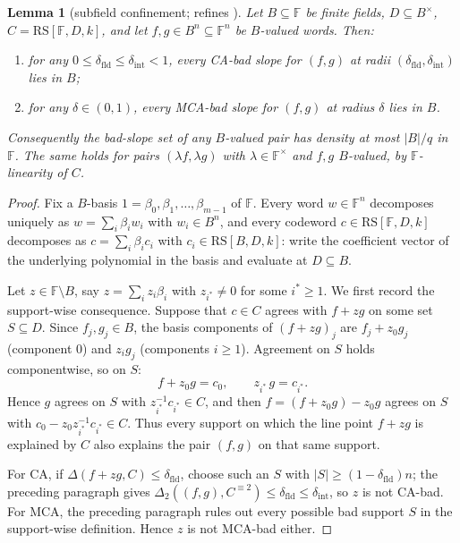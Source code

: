 \documentclass[11pt]{article}
\newtheorem{lemma}[lemma]{Lemma}
\theoremstyle{definition}
\theoremstyle{remark}
\newcommand{\F}{\mathbb{F}}
\newcommand{\B}{B}
\newcommand{\RS}{\mathrm{RS}}
\newcommand{\dist}{\Delta}
\begin{document}
\begin{lemma}[subfield confinement; refines {\cite{Cho26b}}]\label{lem:confine}
Let $\B\subseteq\F$ be finite fields, $D\subseteq\B^\times$, $C=\RS[\F,D,k]$, and let $f,g\in\B^n\subseteq\F^n$ be $\B$-valued words. Then:
\begin{enumerate}[label=\textup{(\alph*)}]
\item for any $0\le\delta_{\mathrm{fld}}\le\delta_{\mathrm{int}}<1$, every CA-bad slope for $(f,g)$ at radii $(\delta_{\mathrm{fld}},\delta_{\mathrm{int}})$ lies in $\B$;
\item for any $\delta\in(0,1)$, every MCA-bad slope for $(f,g)$ at radius $\delta$ lies in $\B$.
\end{enumerate}
Consequently the bad-slope set of any $\B$-valued pair has density at most $|\B|/q$ in $\F$. The same holds for pairs $(\lambda f,\lambda g)$ with $\lambda\in\F^\times$ and $f,g$ $\B$-valued, by $\F$-linearity of $C$.
\end{lemma}

\begin{proof}
Fix a $\B$-basis $1=\beta_0,\beta_1,\dots,\beta_{m-1}$ of $\F$. Every word $w\in\F^n$ decomposes uniquely as $w=\sum_i\beta_i w_i$ with $w_i\in\B^n$, and every codeword $c\in\RS[\F,D,k]$ decomposes as $c=\sum_i\beta_i c_i$ with $c_i\in\RS[\B,D,k]$: write the coefficient vector of the underlying polynomial in the basis and evaluate at $D\subseteq\B$.

Let $z\in\F\setminus\B$, say $z=\sum_iz_i\beta_i$ with $z_{i^*}\ne0$ for some $i^*\ge1$. We first record the support-wise consequence. Suppose that $c\in C$ agrees with $f+zg$ on some set $S\subseteq D$. Since $f_j,g_j\in\B$, the basis components of $(f+zg)_j$ are $f_j+z_0g_j$ (component $0$) and $z_ig_j$ (components $i\ge1$). Agreement on $S$ holds componentwise, so on $S$:
\[
f+z_0g=c_0,\qquad z_{i^*}\,g=c_{i^*}.
\]
Hence $g$ agrees on $S$ with $z_{i^*}^{-1}c_{i^*}\in C$, and then $f=(f+z_0g)-z_0g$ agrees on $S$ with $c_0-z_0z_{i^*}^{-1}c_{i^*}\in C$. Thus every support on which the line point $f+zg$ is explained by $C$ also explains the pair $(f,g)$ on that same support.

For CA, if $\dist(f+zg,C)\le\delta_{\mathrm{fld}}$, choose such an $S$ with $|S|\ge(1-\delta_{\mathrm{fld}})n$; the preceding paragraph gives $\dist_2((f,g),C^{\equiv2})\le\delta_{\mathrm{fld}}\le\delta_{\mathrm{int}}$, so $z$ is not CA-bad. For MCA, the preceding paragraph rules out every possible bad support $S$ in the support-wise definition. Hence $z$ is not MCA-bad either.
\end{proof}
\end{document}
